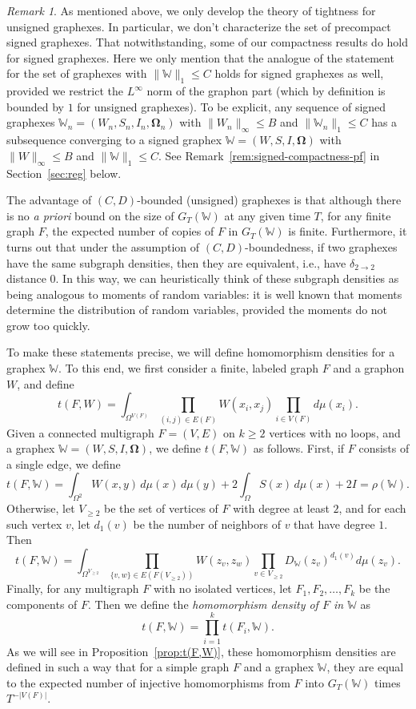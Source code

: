 \documentclass{amsart}
\numberwithin{equation}{section}
\numberwithin{figure}{section}
\theoremstyle{definition}
\theoremstyle{remark}
\newtheorem{remark}[theorem]{Remark}
\newcommand{\bOmega}{{\mathbf{\Omega}}}
\newcommand{\cW}{\mathbb{W}}
\newcommand{\deltt}{\delta_{2\to 2}}
\begin{document}
\begin{remark}\label{rem:signed-compactness}
As mentioned above, we only develop the theory of tightness for unsigned
graphexes. In particular, we don't characterize the set of precompact signed
graphexes. That notwithstanding, some of our compactness results do hold for
signed graphexes. Here we only mention that the analogue of the statement for
the set of graphexes with $\|\cW\|_1 \le C$ holds for signed graphexes as
well, provided we restrict the $L^\infty$ norm of the graphon part (which by
definition is bounded by $1$ for unsigned graphexes). To be explicit, any
sequence of signed graphexes $\cW_n=(W_n,S_n,I_n,\bOmega_n)$ with
$\|W_n\|_\infty\leq B$ and $\|\cW_n\|_1\leq C$ has a subsequence converging
to a signed graphex $\cW=(W,S,I,\bOmega)$ with $\|W\|_\infty\leq B$ and
$\|\cW\|_1\leq C$. See Remark~\ref{rem:signed-compactness-pf} in
Section~\ref{sec:reg} below.
\end{remark}

The advantage of $(C,D)$-bounded (unsigned) graphexes is that although there
is no \emph{a priori} bound on the size of $G_T(\cW)$ at any given time $T$,
for any finite graph $F$, the expected number of copies of $F$ in $G_T(\cW)$
is finite. Furthermore, it turns out that under the assumption of
$(C,D)$-boundedness, if two graphexes have the same subgraph densities, then
they are equivalent, i.e., have $\deltt$ distance $0$. In this way, we can
heuristically think of these subgraph densities as being analogous to moments
of random variables: it is well known that moments determine the distribution
of random variables, provided the moments do not grow too quickly.

To make these statements precise, we will define homomorphism densities for a
graphex $\cW$. To this end, we first consider a finite, labeled graph $F$ and
a graphon $W$, and define
\[t(F,W)=\int_{\Omega^{V(F)}} \prod_{(i,j) \in E(F)} W(x_i,x_j) \prod_{i \in V(F)} d\mu(x_i).
\]
Given a connected multigraph $F=(V,E)$ on $k \ge 2$ vertices with no loops,
and a graphex $\cW=(W,S,I,\bOmega)$, we define $t(F,\cW)$ as follows. First,
if $F$ consists of a single edge, we define
\[t(F,\cW)=\int_{\Omega^2} W(x,y)\,d\mu(x)\,d\mu(y) + 2 \int_{\Omega} S(x) \,d\mu(x) + 2I=
\rho(\cW).
\]
Otherwise, let $V_{\ge 2}$ be the set of vertices of $F$ with degree at least
$2$, and for each such vertex $v$, let $d_1(v)$ be the number of neighbors of
$v$ that have degree $1$. Then
\[t(F,\cW)=\int_{\Omega^{V_{\ge 2}}} \prod_{\{v,w\} \in E(F(V_{\geq 2}))}
W(z_v,z_w) \prod_{v \in V_{\ge 2}} D_{\cW}(z_v)^{d_1(v)}
d\mu(z_v).
\]
Finally, for any multigraph $F$ with no isolated vertices, let
$F_1,F_2,\dots,F_k$ be the components of $F$. Then we define the
\emph{homomorphism density of $F$ in $\cW$} as
\[t(F,\cW)=\prod_{i=1}^k t(F_i,\cW)
.\] As we will see in Proposition~\ref{prop:t(F,W)}, these homomorphism
densities are defined in such a way that for a simple graph $F$ and a graphex
$\cW$, they are equal to the expected number of injective homomorphisms from
$F$ into $G_T(\cW)$ times $T^{-|V(F)|}$.
\end{document}
